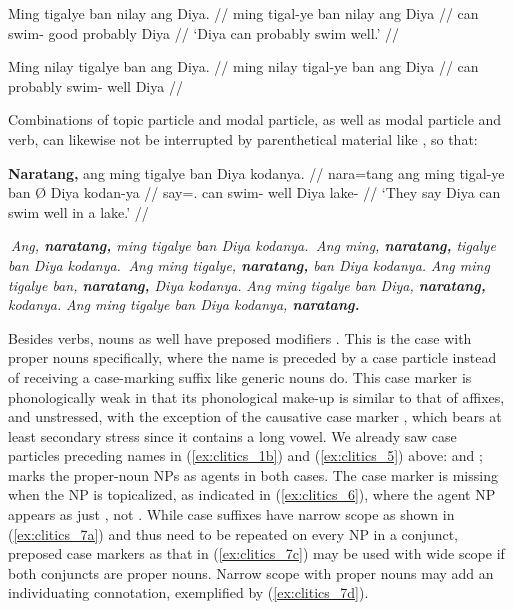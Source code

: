 \pex\label{ex:clitics_5}
\a\label{ex:clitics_5a}\begingl
	\gla Ming tigalye ban nilay ang Diya. //
	\glb ming tigal-ye ban nilay ang Diya //
	\glc can swim-\TsgF{} good probably \Aarg{} Diya //
	\glft `Diya can probably swim well.' //
\endgl

\a\label{ex:clitics_5b}\ljudge{*}\begingl
	\gla Ming nilay tigalye ban ang Diya. //
	\glb ming nilay tigal-ye ban ang Diya //
	\glc can probably swim-\TsgF{} well \Aarg{} Diya //
\endgl
\xe

Combinations of topic particle and modal particle, as well as modal particle
and verb, can likewise not be interrupted by parenthetical material like
, so that:

\pex\label{ex:clitics_6}
\a\label{ex:clitics_6a}\begingl
	\gla \textbf{Naratang,} ang ming tigalye ban {} Diya kodanya. //
	\glb nara=tang ang ming tigal-ye ban Ø Diya kodan-ya //
	\glc say=\TplM{}.\Aarg{} \AgtT{} can swim-\TsgF{} well \Top{} Diya 
		lake-\Loc{}	//
	\glft `They say Diya can swim well in a lake.' //
\endgl

\a \ljudge{*} \textit{Ang, \textbf{naratang,} ming tigalye ban Diya kodanya.}
\a \ljudge{*} \textit{Ang ming, \textbf{naratang,} tigalye ban Diya kodanya.}
\a \ljudge{\ques} \textit{Ang ming tigalye, \textbf{naratang,} ban Diya
	kodanya.}
\a \textit{Ang ming tigalye ban, \textbf{naratang,} Diya kodanya.}
\a \textit{Ang ming tigalye ban Diya, \textbf{naratang,} kodanya.}
\a \textit{Ang ming tigalye ban Diya kodanya, \textbf{naratang.}}

\xe

Besides verbs, nouns as well have preposed modifiers . This is the
case with proper nouns specifically, where the name is preceded by a case
particle instead of receiving a case-marking suffix like generic nouns do. This
case marker is phonologically weak in that its phonological make-up is similar
to that of affixes, and unstressed, with the exception of the causative case
marker , which bears at least secondary stress since it contains
a long vowel. We already saw case particles preceding names in
(\ref{ex:clitics_1b}) and (\ref{ex:clitics_5}) above:  and ;   marks the proper-noun NPs
as agents in both cases. The case marker is missing when the NP is topicalized,
as indicated in (\ref{ex:clitics_6}), where the agent NP appears as just
, not . While case suffixes have narrow
scope as shown in (\ref{ex:clitics_7a}) and thus need to be repeated on every
NP in a conjunct, preposed case markers as that in (\ref{ex:clitics_7c}) may be
used with wide scope if both conjuncts are proper nouns. Narrow scope with
proper nouns may add an individuating connotation, exemplified by
(\ref{ex:clitics_7d}).

